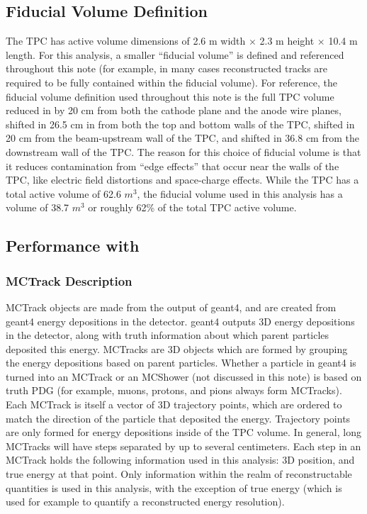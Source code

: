 \subsection{Fiducial Volume Definition}\label{fidvol_section}
The {\ub} TPC has active volume dimensions of 2.6 m width $\times$ 2.3 m height $\times$ 10.4 m length. For this analysis, a smaller ``fiducial volume'' is defined and referenced throughout this note (for example, in many cases reconstructed tracks are required to be fully contained within the fiducial volume). For reference, the fiducial volume definition used throughout this note is the full TPC volume reduced in by 20 cm from both the cathode plane and the anode wire planes, shifted in 26.5 cm in from both the top and bottom walls of the TPC, shifted in 20 cm from the beam-upstream wall of the TPC, and shifted in 36.8 cm from the downstream wall of the TPC. The reason for this choice of fiducial volume is that it reduces contamination from ``edge effects'' that occur near the walls of the TPC, like electric field distortions and space-charge effects. While the TPC has a total active volume of 62.6 $m^3$, the fiducial volume used in this analysis has a volume of 38.7 $m^3$ or roughly 62\% of the total TPC active volume.


\subsection{Performance with }\label{singlemu_mctrack_performance_section}


\subsubsection{MCTrack Description}\label{MCTrack_section}
{\sc MCTrack} objects are made from the output of {\sc geant}4, and are created from {\sc geant}4 energy depositions in the detector. {\sc geant}4 outputs 3D energy depositions in the detector, along with truth information about which parent particles deposited this energy. {\sc MCTracks} are 3D objects which are formed by grouping the energy depositions based on parent particles. Whether a particle in {\sc geant}4 is turned into an {\sc MCTrack} or an {\sc MCShower} (not discussed in this note) is based on truth PDG (for example, muons, protons, and pions always form {\sc MCTracks}).\\

Each {\sc MCTrack} is itself a vector of 3D trajectory points, which are ordered to match the direction of the particle that deposited the energy. Trajectory points are only formed for energy depositions inside of the TPC volume. In general, long {\sc MCTrack}s will have steps separated by up to several centimeters. Each step in an {\sc MCTrack} holds the following information used in this analysis: 3D position, and true energy at that point. Only information within the realm of reconstructable quantities is used in this analysis, with the exception of true energy (which is used for example to quantify a reconstructed energy resolution).\\

